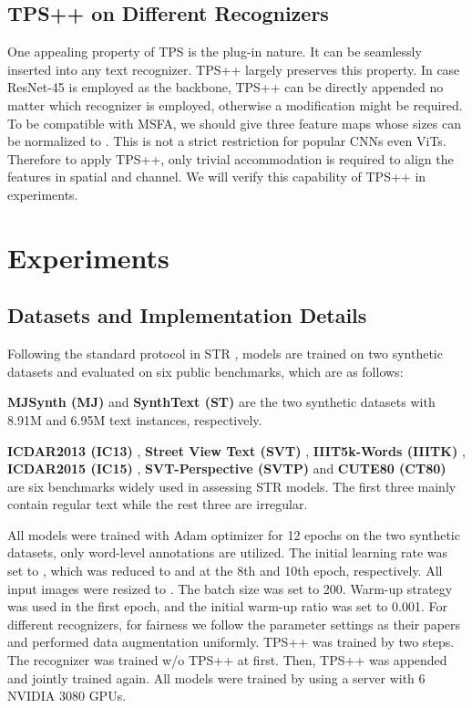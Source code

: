 \documentclass{article}
\begin{document}
\subsection{TPS++ on Different Recognizers}
One appealing property of TPS is the plug-in nature. It can be seamlessly inserted into any text recognizer. TPS++ largely preserves this property. In case ResNet-45 is employed as the backbone, TPS++ can be directly appended no matter which recognizer is employed, otherwise a modification might be required. To be compatible with MSFA, we should give three feature maps whose sizes can be normalized to . This is not a strict restriction for popular CNNs even ViTs. Therefore to apply TPS++, only trivial accommodation is required to align the features in spatial and channel. We will verify this capability of TPS++ in experiments.




\section{Experiments}

\subsection{Datasets and Implementation Details}
Following the standard protocol in STR \cite{Baekwhats_wrong_19ICCV}, models are trained on two synthetic datasets and evaluated on six public benchmarks, which are as follows:

\noindent\textbf{MJSynth (MJ)} \cite{MJor90K} and \textbf{SynthText (ST)} \cite{ST} are the two synthetic datasets with 8.91M and 6.95M text instances, respectively.



\noindent\textbf{ICDAR2013 (IC13)} \cite{ICDAR2013}, \textbf{Street View Text (SVT)} \cite{SVT}, \textbf{IIIT5k-Words (IIITK)} \cite{IIIT5K}, \textbf{ICDAR2015 (IC15)} \cite{ICDAR2015}, \textbf{SVT-Perspective (SVTP)} \cite{SVT-P} and \textbf{CUTE80 (CT80)} \cite{CUTE80} are six benchmarks widely used in assessing STR models. The first three mainly contain regular text while the rest three are irregular. 


All models were trained with Adam optimizer for 12 epochs on the two synthetic datasets, only word-level annotations are utilized. The initial learning rate was set to , which was reduced to  and  at the 8th and 10th epoch, respectively. All input images were resized to . The batch size was set to 200. Warm-up strategy was used in the first epoch, and the initial warm-up ratio was set to 0.001. For different recognizers, for fairness we follow the parameter settings as their papers and performed data augmentation uniformly. TPS++ was trained by two steps. The recognizer was trained w/o TPS++ at first. Then, TPS++ was appended and jointly trained again. All models were trained by using a server with 6 NVIDIA 3080 GPUs.
\end{document}
